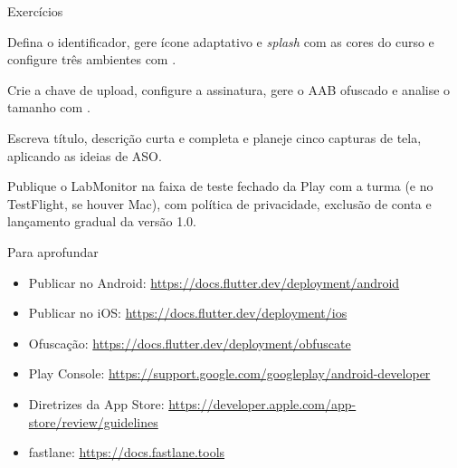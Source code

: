 \documentclass[aspectratio=169,10pt]{beamer}
\begin{document}
\begin{frame}{Exercícios}
  \begin{exercicio}
    Defina o identificador, gere ícone adaptativo e \emph{splash} com as cores do curso e configure três ambientes com .
  \end{exercicio}
  \begin{exercicio}
    Crie a chave de upload, configure a assinatura, gere o AAB ofuscado e analise o tamanho com .
  \end{exercicio}
  \begin{exercicio}
    Escreva título, descrição curta e completa e planeje cinco capturas de tela, aplicando as ideias de ASO.
  \end{exercicio}
  \begin{projeto}
    Publique o LabMonitor na faixa de teste fechado da Play com a turma (e no TestFlight, se houver Mac), com política de privacidade, exclusão de conta e lançamento gradual da versão 1.0.
  \end{projeto}
\end{frame}

\begin{frame}{Para aprofundar}
  \small
  \begin{itemize}
    \item Publicar no Android: \url{https://docs.flutter.dev/deployment/android}
    \item Publicar no iOS: \url{https://docs.flutter.dev/deployment/ios}
    \item Ofuscação: \url{https://docs.flutter.dev/deployment/obfuscate}
    \item Play Console: \url{https://support.google.com/googleplay/android-developer}
    \item Diretrizes da App Store: \url{https://developer.apple.com/app-store/review/guidelines}
    \item fastlane: \url{https://docs.fastlane.tools}
  \end{itemize}
\end{frame}
\end{document}
